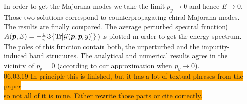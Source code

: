 In order to get the Majorana modes we take the limit $p_y\rightarrow 0$ and hence $E\rightarrow0$. Those two solutions correspond to counterpropagating chiral Majorana modes.\\

The results are finally compared. The average perturbed spectral function($A(\boldsymbol{p},E) = -\frac{1}{\pi}\Im\{\text{Tr}[\mathcal{G}(\boldsymbol{p},\boldsymbol{p},y)] \}$) is plotted in order to get the energy spectrum. The poles of this function contain both, the unperturbed and the impurity-induced band structures. The analytical and numerical results agree in the vicinity of $p_y=0$ (according to our approximation when $p_y\rightarrow0$).\\

\colorbox{orange}{06.03.19 In principle this is finished, but it has a lot of textual phrases from the paper}\\
\colorbox{orange}{so not all of it is mine. Either rewrite those parts or cite correctly.}